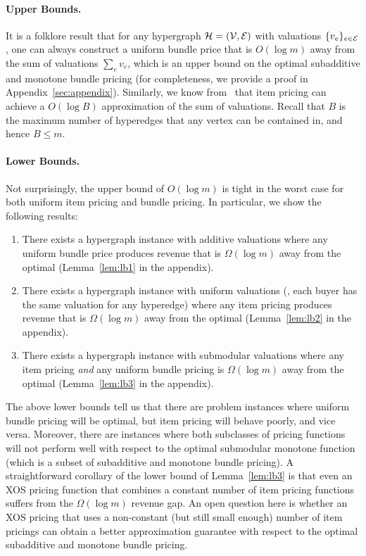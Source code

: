 \paragraph{Upper Bounds.}
It is a folklore result that for any hypergraph $\mathcal{H} = (\mathcal{V}, \mathcal{E})$ with valuations $\{v_e\}_{e \in \mathcal{E}}$, one can always construct a uniform bundle price that is $O(\log m)$ away from
the sum of valuations $\sum_e v_e$, which is an upper bound on the optimal subadditive and monotone bundle pricing (for completeness, we provide a proof in Appendix~\ref{sec:appendix}). Similarly, we know from~\cite{cheung2008approximation} that item pricing can achieve a $O(\log B)$ approximation of the sum of valuations. Recall that 
$B$ is the maximum number of hyperedges that any vertex can be contained in, and hence $B \leq m$. 

\paragraph{Lower Bounds.}
Not surprisingly, the upper bound of $O(\log m)$ is tight in the worst case for both uniform item pricing and bundle pricing. In particular, we show the following results:
%
\begin{enumerate}
\item There exists a hypergraph instance with additive valuations where any uniform bundle price produces revenue that is $\Omega(\log m)$ away from the optimal (Lemma~\ref{lem:lb1} in the appendix).
\item There exists a hypergraph instance with uniform valuations (\ie, each buyer has the same valuation for any hyperedge) where any item pricing produces revenue that is $\Omega(\log m)$ away from the optimal (Lemma~\ref{lem:lb2} in the appendix).
\item There exists a hypergraph instance with submodular valuations where any item pricing {\em and} any uniform bundle pricing is  $\Omega(\log m)$ away from the optimal (Lemma~\ref{lem:lb3} in the appendix).
\end{enumerate} 

The above lower bounds tell us that there are problem instances where uniform bundle pricing will be optimal, but item pricing will behave poorly, and vice versa. Moreover, there are instances where both subclasses of pricing functions will not perform well with respect to the optimal submodular monotone function 
(which is a subset of subadditive and monotone bundle pricing).
 A straightforward corollary of the lower bound of Lemma~\ref{lem:lb3} is that even an XOS pricing function that combines a constant number of item pricing functions suffers from the 
 $\Omega(\log m)$ revenue gap. An open question here is whether an XOS pricing that uses a non-constant (but still small enough) number of item pricings can obtain a better approximation guarantee with respect to the optimal subadditive and monotone bundle pricing.



